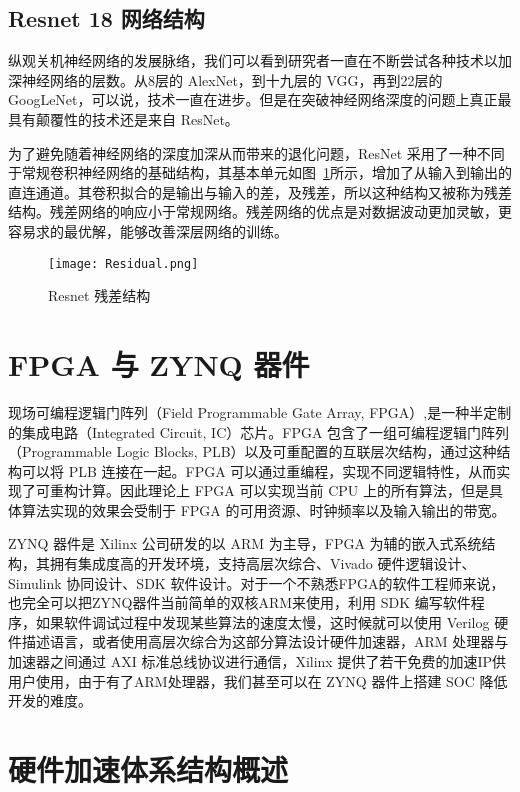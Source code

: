 \subsection{Resnet 18 网络结构}

纵观关机神经网络的发展脉络，我们可以看到研究者一直在不断尝试各种技术以加深神经网络的层数。从8层的 AlexNet，到十九层的 VGG，再到22层的 GoogLeNet，可以说，技术一直在进步。但是在突破神经网络深度的问题上真正最具有颠覆性的技术还是来自 ResNet。

为了避免随着神经网络的深度加深从而带来的退化问题，ResNet 采用了一种不同于常规卷积神经网络的基础结构，其基本单元如图~\ref{fig:Residual}所示，增加了从输入到输出的直连通道。其卷积拟合的是输出与输入的差，及残差，所以这种结构又被称为残差结构。残差网络的响应小于常规网络\citep{DBLP:journals/corr/HeZRS15}。残差网络的优点是对数据波动更加灵敏，更容易求的最优解，能够改善深层网络的训练。

\begin{figure}[!htbp]
    \centering
    \texttt{[image: Residual.png]}
    \caption{Resnet 残差结构}
    \label{fig:Residual}
\end{figure}


\section{FPGA 与 ZYNQ 器件}

现场可编程逻辑门阵列（Field Programmable Gate Array, FPGA）,是一种半定制的集成电路（Integrated Circuit, IC）芯片。FPGA 包含了一组可编程逻辑门阵列（Programmable Logic Blocks, PLB）以及可重配置的互联层次结构，通过这种结构可以将 PLB 连接在一起。FPGA 可以通过重编程，实现不同逻辑特性，从而实现了可重构计算。因此理论上 FPGA 可以实现当前 CPU 上的所有算法，但是具体算法实现的效果会受制于 FPGA 的可用资源、时钟频率以及输入输出的带宽。

ZYNQ 器件是 Xilinx 公司研发的以 ARM 为主导，FPGA 为辅的嵌入式系统结构，其拥有集成度高的开发环境，支持高层次综合、Vivado 硬件逻辑设计、Simulink 协同设计、SDK 软件设计。对于一个不熟悉FPGA的软件工程师来说，也完全可以把ZYNQ器件当前简单的双核ARM来使用，利用 SDK 编写软件程序，如果软件调试过程中发现某些算法的速度太慢，这时候就可以使用 Verilog 硬件描述语言，或者使用高层次综合为这部分算法设计硬件加速器，ARM 处理器与加速器之间通过 AXI 标准总线协议进行通信，Xilinx 提供了若干免费的加速IP供用户使用，由于有了ARM处理器，我们甚至可以在 ZYNQ 器件上搭建 SOC 降低开发的难度。

\section{硬件加速体系结构概述}

